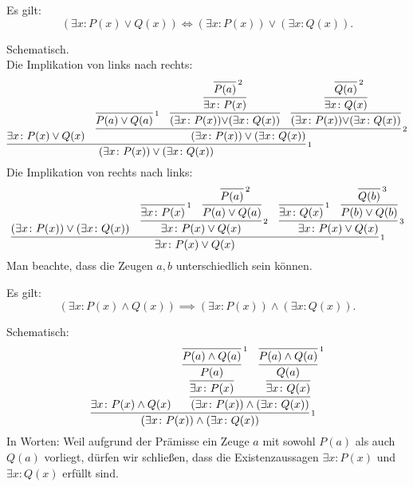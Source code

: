 \begin{Satz}\label{exists-dl}
Es gilt:
\[(\exists x\colon P(x)\lor Q(x)) \iff
(\exists x\colon P(x))\lor(\exists x\colon Q(x)).\]
\end{Satz}
\begin{Beweis} Schematisch.\\
Die Implikation von links nach rechts:
\[
\infer[\infernote{1}]{(\exists x\colon P(x))\lor (\exists x\colon Q(x))}{
  \exists x\colon P(x)\lor Q(x)
  &
  \infer[\infernote{2}]{(\exists x\colon P(x))\lor (\exists x\colon Q(x))}{
    \infer[\infernote{1}]{P(a)\lor Q(a)}{}
    & \infer{(\exists x\colon P(x)){\lor}(\exists x\colon Q(x))}{\infer{
        \exists x\colon P(x)}{\infer[\infernote{2}]{P(a)}{}}}
    & \infer{(\exists x\colon P(x)){\lor}(\exists x\colon Q(x))}{\infer{
        \exists x\colon Q(x)}{\infer[\infernote{2}]{Q(a)}{}}}
  }
}
\]
Die Implikation von rechts nach links:
\[\infer[\infernote{1}]{\exists x\colon P(x)\lor Q(x)}{
  (\exists x\colon P(x))\lor(\exists x\colon Q(x))
  & \infer[\infernote{2}]{\exists x\colon P(x)\lor Q(x)}{
      \infer[\infernote{1}]{\exists x\colon P(x)}{}
      &
      \infer{P(a)\lor Q(a)}{
        \infer[\infernote{2}]{P(a)}{}}}
  & \infer[\infernote{3}]{\exists x\colon P(x)\lor Q(x)}{
      \infer[\infernote{1}]{\exists x\colon Q(x)}{}
      &
      \infer{P(b)\lor Q(b)}{
        \infer[\infernote{3}]{Q(b)}{}}}
}\]
Man beachte, dass die Zeugen $a,b$ unterschiedlich sein können.\,\qedsymbol
\end{Beweis}

\begin{Satz}\label{exists-asym-dl}
Es gilt:
\[(\exists x\colon P(x)\land Q(x)) \implies (\exists x\colon P(x))\land (\exists x\colon Q(x)).\]
\end{Satz}
\begin{Beweis} Schematisch:
\[\infer[\infernote{1}]{(\exists x\colon P(x))\land (\exists x\colon Q(x))}{
\exists x\colon P(x)\land Q(x)
& \infer{(\exists x\colon P(x))\land (\exists x\colon Q(x))}{
  \infer{\exists x\colon P(x)}{
       \infer{P(a)}{\infer[\infernote{1}]{P(a)\land Q(a)}{}}}
  & \infer{\exists x\colon Q(x)}{
       \infer{Q(a)}{\infer[\infernote{1}]{P(a)\land Q(a)}{}}}}
}\]
In Worten: Weil aufgrund der Prämisse ein Zeuge $a$ mit sowohl $P(a)$
als auch $Q(a)$ vorliegt, dürfen wir schließen, dass die
Existenzaussagen $\exists x\colon P(x)$ und $\exists x\colon Q(x)$
erfüllt sind.\,\qedsymbol
\end{Beweis}

